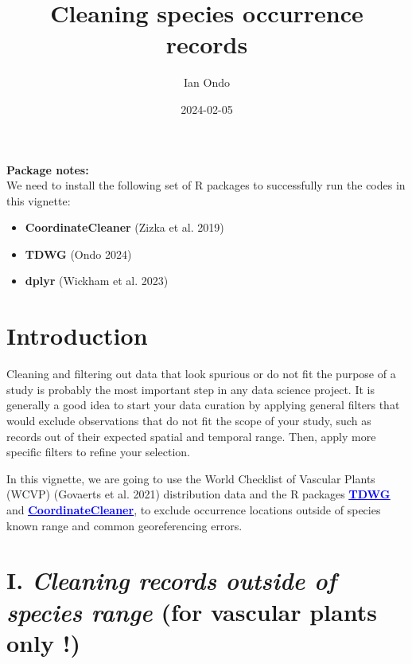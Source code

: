 \documentclass[
]{article}
\title{Cleaning species occurrence records}
\author{Ian Ondo}
\date{2024-02-05}
\providecommand{\tightlist}{%
  \setlength{\itemsep}{0pt}\setlength{\parskip}{0pt}}
\begin{document}
\maketitle

{
\setcounter{tocdepth}{2}
\tableofcontents
}
\begin{warningbox}

\textbf{Package notes:}\\
We need to install the following set of R packages to successfully run
the codes in this vignette:

\begin{itemize}
\tightlist
\item
  \textbf{CoordinateCleaner} (Zizka et al. 2019)
\item
  \textbf{TDWG} (Ondo 2024)
\item
  \textbf{dplyr} (Wickham et al. 2023)
\end{itemize}

\end{warningbox}

\hypertarget{introduction}{%
\section{Introduction}\label{introduction}}

Cleaning and filtering out data that look spurious or do not fit the
purpose of a study is probably the most important step in any data
science project. It is generally a good idea to start your data curation
by applying general filters that would exclude observations that do not
fit the scope of your study, such as records out of their expected
spatial and temporal range. Then, apply more specific filters to refine
your selection.

In this vignette, we are going to use the World Checklist of Vascular
Plants (WCVP) (Govaerts et al. 2021) distribution data and the R
packages
\href{https://github.com/IanOndo/TDWG}{\textbf{\textcolor{blue}{\underline{TDWG}}}}
and
\href{https://cran.r-project.org/web/packages/CoordinateCleaner/CoordinateCleaner.pdf}{\textbf{\textcolor{blue}{\underline{CoordinateCleaner}}}},
to exclude occurrence locations outside of species known range and
common georeferencing errors.

\hypertarget{i.-cleaning-records-outside-of-species-range-for-vascular-plants-only}{%
\section{\texorpdfstring{I. \emph{Cleaning records outside of species
range} (for vascular plants only
!)}{I. Cleaning records outside of species range (for vascular plants only !)}}\label{i.-cleaning-records-outside-of-species-range-for-vascular-plants-only}}
\end{document}
